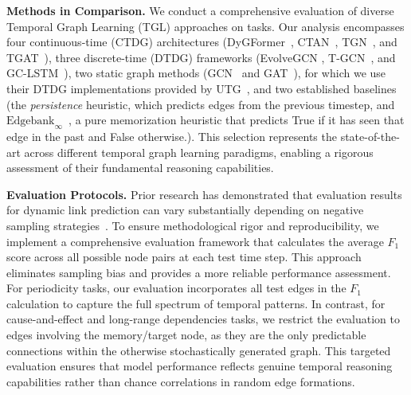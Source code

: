 
 \textbf{Methods in Comparison.} We conduct a comprehensive evaluation of diverse Temporal Graph Learning (TGL) approaches on \benchmarkname tasks. Our analysis encompasses four continuous-time (CTDG) architectures (DyGFormer~\cite{dygformer}, CTAN~\cite{ctan}, TGN~\cite{tgn}, and TGAT~\cite{tgat}), three discrete-time (DTDG) frameworks (EvolveGCN \cite{evolvegcn}, T-GCN~\cite{tgcn}, and GC-LSTM~\cite{gclstm}), two static graph methods (GCN~\citep{gcn} and GAT~\citep{gat}), for which we use their DTDG implementations provided by UTG~\citep{huangutg}, and two established baselines (the \textit{persistence} heuristic, which predicts edges from the previous timestep, and $\text{Edgebank}_{\infty}$~\citep{poursafaei2022betterevaluationdynamiclink}, a pure memorization heuristic that predicts True if it has seen that edge in the past and False otherwise.). This selection represents the state-of-the-art across different temporal graph learning paradigms, enabling a rigorous assessment of their fundamental reasoning capabilities. 




\textbf{Evaluation Protocols.}
Prior research has demonstrated that evaluation results for dynamic link prediction can vary substantially depending on negative sampling strategies~\cite{poursafaei2022betterevaluationdynamiclink}. To ensure methodological rigor and reproducibility, we implement a comprehensive evaluation framework that calculates the average $F_1$ score across all possible node pairs at each test time step. This approach eliminates sampling bias and provides a more reliable performance assessment. For periodicity tasks, our evaluation incorporates all test edges in the $F_1$ calculation to capture the full spectrum of temporal patterns. In contrast, for cause-and-effect and long-range dependencies tasks, we restrict the evaluation to edges involving the memory/target node, as they are the only predictable connections within the otherwise stochastically generated graph. This targeted evaluation ensures that model performance reflects genuine temporal reasoning capabilities rather than chance correlations in random edge formations.


